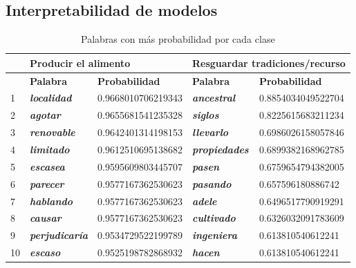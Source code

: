 \documentclass[
	spanish, %
	letterpaper, oneside
]{article}
\begin{document}
\subsection{Interpretabilidad de modelos}

\begin{table}[htbp]
\centering
\caption{Palabras con más probabilidad por cada clase}
\begin{tabular}{l|ll|ll|}
\cline{2-5}
                                & \multicolumn{2}{l|}{\textbf{Producir el alimento}}                       & \multicolumn{2}{l|}{\textbf{Resguardar tradiciones/recurso}}            \\ \hline
\multicolumn{1}{|l|}{\textbf{}} & \multicolumn{1}{l|}{\textbf{Palabra}}               & \textbf{Probabilidad} & \multicolumn{1}{l|}{\textbf{Palabra}}              & \textbf{Probabilidad} \\ \hline
\multicolumn{1}{|l|}{1}         & \multicolumn{1}{l|}{\textit{\textbf{localidad}}}    & 0.9668010706219343 & \multicolumn{1}{l|}{\textit{\textbf{ancestral}}}   & 0.8854034049522704 \\ \hline
\multicolumn{1}{|l|}{2}         & \multicolumn{1}{l|}{\textit{\textbf{agotar}}}       & 0.9655681541235328 & \multicolumn{1}{l|}{\textit{\textbf{siglos}}}      & 0.8225615683211234 \\ \hline
\multicolumn{1}{|l|}{3}         & \multicolumn{1}{l|}{\textit{\textbf{renovable}}}    & 0.9642401314198153 & \multicolumn{1}{l|}{\textit{\textbf{llevarlo}}}    & 0.6986026158057846 \\ \hline
\multicolumn{1}{|l|}{4}         & \multicolumn{1}{l|}{\textit{\textbf{limitado}}}     & 0.9612510695138682 & \multicolumn{1}{l|}{\textit{\textbf{propiedades}}} & 0.6899382168962785 \\ \hline
\multicolumn{1}{|l|}{5}         & \multicolumn{1}{l|}{\textit{\textbf{escasea}}}      & 0.9595609803445707 & \multicolumn{1}{l|}{\textit{\textbf{pasen}}}       & 0.6759654794382005 \\ \hline
\multicolumn{1}{|l|}{6}         & \multicolumn{1}{l|}{\textit{\textbf{parecer}}}      & 0.9577167362530623 & \multicolumn{1}{l|}{\textit{\textbf{pasando}}}     & 0.657596180886742  \\ \hline
\multicolumn{1}{|l|}{7}         & \multicolumn{1}{l|}{\textit{\textbf{hablando}}}     & 0.9577167362530623 & \multicolumn{1}{l|}{\textit{\textbf{adele}}}       & 0.6496517790919291 \\ \hline
\multicolumn{1}{|l|}{8}         & \multicolumn{1}{l|}{\textit{\textbf{causar}}}       & 0.9577167362530623 & \multicolumn{1}{l|}{\textit{\textbf{cultivado}}}   & 0.6326032091783609 \\ \hline
\multicolumn{1}{|l|}{9}         & \multicolumn{1}{l|}{\textit{\textbf{perjudicaría}}} & 0.9534729522199789 & \multicolumn{1}{l|}{\textit{\textbf{ingeniera}}}   & 0.613810540612241  \\ \hline
\multicolumn{1}{|l|}{10}        & \multicolumn{1}{l|}{\textit{\textbf{escaso}}}       & 0.9525198782868932 & \multicolumn{1}{l|}{\textit{\textbf{hacen}}}       & 0.613810540612241  \\ \hline
\end{tabular}
\end{table}
\end{document}
